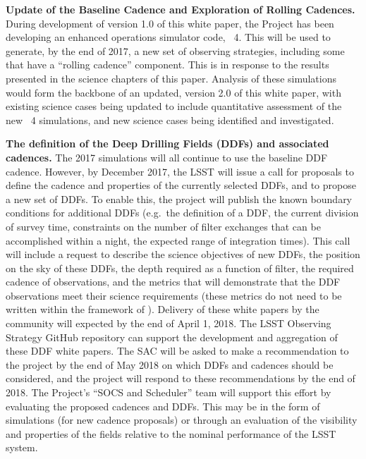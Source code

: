 \begin{description}

\item{\textbf{Update of the Baseline Cadence and Exploration of Rolling
Cadences.}} During development of version 1.0 of this white paper, the
Project has been developing an enhanced operations simulator code,
\OpSim~4. This will be used to generate, by the end of 2017, a new set of
observing strategies, including some that have a ``rolling cadence''
component. This is in response to the results presented in the science
chapters of this paper. Analysis of these simulations would form the
backbone of an updated, version 2.0 of this white paper, with existing
science cases being updated to include quantitative assessment of the
new \OpSim~4 simulations, and new science cases being identified and
investigated.

\item{\textbf{The definition of the Deep Drilling Fields (DDFs) and
associated cadences.}} The 2017 simulations will all continue
to use the baseline DDF cadence. However, by December 2017, the LSST
will issue a call for proposals to define the cadence and properties of
the currently selected DDFs, and to propose a new set of DDFs. To enable
this, the project will publish the known boundary conditions for
additional DDFs (e.g.\ the definition of a DDF, the current division of
survey time, constraints on the number of filter exchanges that can be
accomplished within a night, the expected range of integration times).
This call will include a request to describe the science objectives of
new DDFs, the position on the sky of these DDFs, the depth required as a
function of filter, the required cadence of observations, and the
metrics that will demonstrate that the DDF observations meet their
science requirements (these metrics do not need to be written within the
framework of \MAF). Delivery of these white papers by the community will
expected by the end of April 1, 2018.  The LSST Observing Strategy GitHub
repository can support the development and aggregation of these DDF
white papers. The SAC will be asked to make a recommendation to the
project by the end of May 2018 on which DDFs and cadences should be
considered, and the project will respond to these recommendations by
the end of 2018. The Project's ``SOCS and Scheduler'' team will support
this effort by evaluating the proposed cadences and DDFs. This may be in
the form of simulations (for new cadence proposals) or through an
evaluation of the visibility and properties of the fields relative to
the nominal performance of the LSST system.


\end{description}

